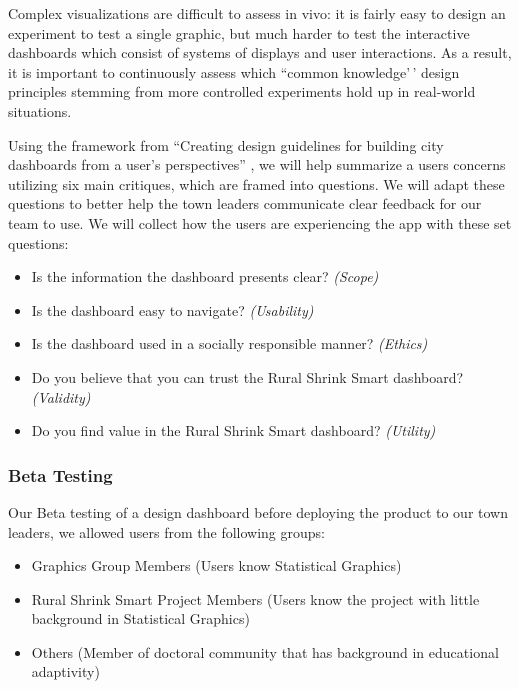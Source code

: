 \documentclass[letterpaper,inpress]{jdsart}
\begin{document}
Complex visualizations are difficult to assess in vivo: it is fairly easy to design an experiment to test a single graphic, but much harder to test the interactive dashboards which consist of systems of displays and user interactions. As a result, it is important to continuously assess which ``common knowledge'\,' design principles stemming from more controlled experiments hold up in real-world situations.

Using the framework from ``Creating design guidelines for building city dashboards from a user's perspectives'' \citep{lee}, we will help summarize a users concerns utilizing six main critiques, which are framed into questions. We will adapt these questions to better help the town leaders communicate clear feedback for our team to use. We will collect how the users are experiencing the app with these set questions:

\begin{itemize}
\item Is the information the dashboard presents clear? \textit{(Scope)}
\item Is the dashboard easy to navigate? \textit{(Usability)}
\item Is the dashboard used in a socially responsible manner? \textit{(Ethics)}
\item Do you believe that you can trust the Rural Shrink Smart dashboard? \textit{(Validity)}
\item Do you find value in the Rural Shrink Smart dashboard? \textit{(Utility)}
\end{itemize}

\subsubsection{Beta Testing}

Our Beta testing of a design dashboard before deploying the product to our town leaders, we allowed users from the following groups:

\begin{itemize}
    \item Graphics Group Members (Users know Statistical Graphics)
    \item Rural Shrink Smart Project Members (Users know the project with little background in Statistical Graphics)
    \item  Others (Member of doctoral community that has background in educational adaptivity)
\end{itemize}
\end{document}
